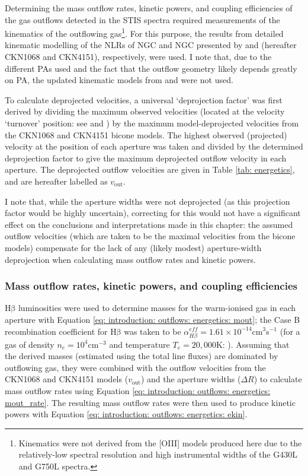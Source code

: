 Determining the mass outflow rates, kinetic powers, and coupling efficiencies of the gas outflows detected in the STIS spectra required measurements of the kinematics of the outflowing gas\footnote{Kinematics were not derived from the [OIII] models produced here due to the relatively-low spectral resolution and high instrumental widths of the G430L and G750L spectra.}. For this purpose, the results from detailed kinematic modelling of the NLRs of NGC and NGC presented by \citet{Crenshaw2000_N1068} and \citet{Crenshaw2000_N4151} (hereafter CKN1068 and CKN4151), respectively, were used. I note that, due to the different PAs used and the fact that the outflow geometry likely depends greatly on PA, the updated kinematic models from \citet{Das2005} and \citet{Das2006} were not used. 

To calculate deprojected velocities, a universal `deprojection factor' was first derived by dividing the maximum observed velocities (located at the velocity `turnover' position: see \citealt{Crenshaw2000_N1068} and \citealt{Crenshaw2000_N4151}) by the maximum model-deprojected velocities from the CKN1068 and CKN4151 bicone models. The highest observed (projected) velocity at the position of each aperture was taken and divided by the determined deprojection factor to give the maximum deprojected outflow velocity in each aperture. The deprojected outflow velocities are given in Table \ref{tab: energetics}, and are hereafter labelled as $v_\mathrm{out}$. 

I note that, while the aperture widths were not deprojected (as this projection factor would be highly uncertain), correcting for this would not have a significant effect on the conclusions and interpretations made in this chapter: the assumed outflow velocities (which are taken to be the maximal velocities from the bicone models) compensate for the lack of any (likely modest) aperture-width deprojection when calculating mass outflow rates and kinetic powers.

\subsubsection{Mass outflow rates, kinetic powers, and coupling efficiencies}
\label{section: stis_seyferts: mout_ekin_fkin}

H$\mathrm{\beta}$ luminosities were used to determine masses for the warm-ionised gas in each aperture with Equation \ref{eq: introduction: outflows: energetics: mout}; the Case B recombination coefficient for H$\mathrm{\beta}$ was taken to be $\alpha^{eff}_{H\beta}=1.61\times10^{-14}$\;cm$^3$\;s$^{-1}$ (for a gas of density $n_e=10^4$\;cm$^{-3}$ and temperature $T_e=20,000$\;K: \citealt{Osterbrock2006}). Assuming that the derived masses (estimated using the total line fluxes) are dominated by outflowing gas, they were combined with the outflow velocities from the CKN1068 and CKN4151 models ($v_\mathrm{out}$) and the aperture widths ($\Delta R$) to calculate mass outflow rates using Equation \ref{eq: introduction: outflows: energetics: mout_rate}. The resulting mass outflow rates were then used to produce kinetic powers with Equation \ref{eq: introduction: outflows: energetics: ekin}.

